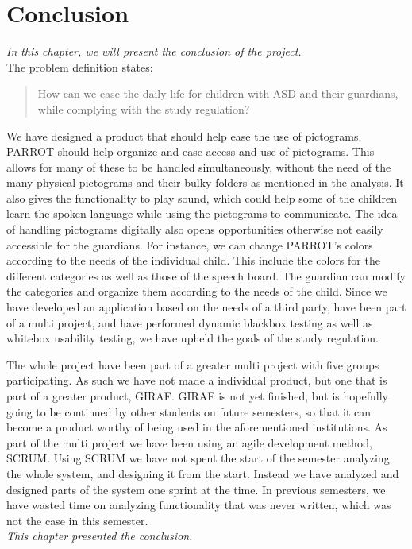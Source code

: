 \chapter{Conclusion}

\textit{In this chapter, we will present the conclusion of the project.}\newline
\\
The problem definition states:
\begin{quote}
How can we ease the daily life for children with ASD and their guardians, while complying with the study regulation?
\end{quote}

We have designed a product that should help ease the use of pictograms. 
PARROT should help organize and ease access and use of pictograms. This allows for many of these to be handled simultaneously, without the need of the many physical pictograms and their bulky folders as mentioned in the analysis.\newline
It also gives the functionality to play sound, which could help some of the children learn the spoken language while using the pictograms to communicate. 
The idea of handling pictograms digitally also opens opportunities otherwise not easily accessible for the guardians.
For instance, we can change PARROT's colors according to the needs of the individual child. This include the colors for the different categories as well as those of the speech board.
The guardian can modify the categories and organize them according to the needs of the child.\newline
Since we have developed an application based on the needs of a third party, have been part of a multi project, and have performed dynamic blackbox testing as well as whitebox usability testing, we have upheld the goals of the study regulation.\newline

The whole project have been part of a greater multi project with five groups participating. 
As such we have not made a individual product, but one that is part of a greater product, GIRAF.  
GIRAF is not yet finished, but is hopefully going to be continued by other students on future semesters, so that it can become a product worthy of being used in the aforementioned institutions.\newline
As part of the multi project we have been using an agile development method, SCRUM.
Using SCRUM we have not spent the start of the semester analyzing the whole system, and designing it from the start. Instead we have analyzed and designed parts of the system one sprint at the time.
In previous semesters, we have wasted time on analyzing functionality that was never written, which was not the case in this semester.\newline
\\
\textit{This chapter presented the conclusion.}